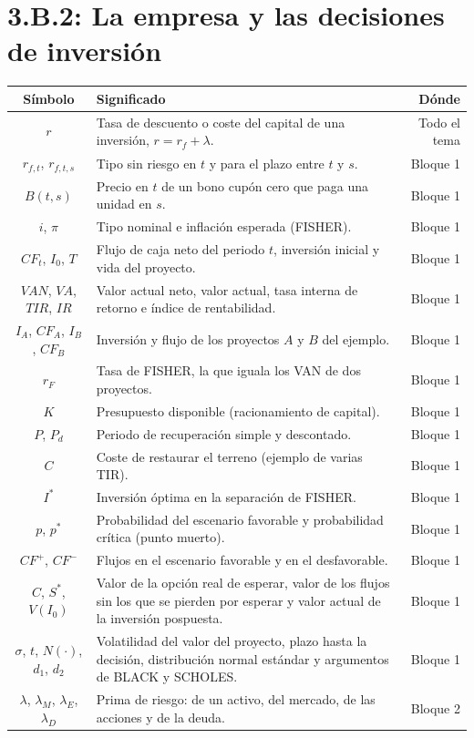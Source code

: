 \documentclass[10pt,a4paper]{article}
\newcommand{\cabecera}{\toprule\textbf{Símbolo} & \textbf{Significado} & \textbf{Dónde}\\\midrule\endhead\bottomrule\endfoot}
\begin{document}
\section{3.B.2: La empresa y las decisiones de inversión}
\begin{longtable}{SMD}
\cabecera
$r$ & Tasa de descuento o coste del capital de una inversión, $r=r_f+\lambda$. & Todo el tema\\
$r_{f,t}$, $r_{f,t,s}$ & Tipo sin riesgo en $t$ y para el plazo entre $t$ y $s$. & Bloque 1\\
$B(t,s)$ & Precio en $t$ de un bono cupón cero que paga una unidad en $s$. & Bloque 1\\
$i$, $\pi$ & Tipo nominal e inflación esperada (FISHER). & Bloque 1\\
$CF_t$, $I_0$, $T$ & Flujo de caja neto del periodo $t$, inversión inicial y vida del proyecto. & Bloque 1\\
$VAN$, $VA$, $TIR$, $IR$ & Valor actual neto, valor actual, tasa interna de retorno e índice de rentabilidad. & Bloque 1\\
$I_A$, $CF_A$, $I_B$, $CF_B$ & Inversión y flujo de los proyectos $A$ y $B$ del ejemplo. & Bloque 1\\
$r_F$ & Tasa de FISHER, la que iguala los VAN de dos proyectos. & Bloque 1\\
$K$ & Presupuesto disponible (racionamiento de capital). & Bloque 1\\
$P$, $P_d$ & Periodo de recuperación simple y descontado. & Bloque 1\\
$C$ & Coste de restaurar el terreno (ejemplo de varias TIR). & Bloque 1\\
$I^*$ & Inversión óptima en la separación de FISHER. & Bloque 1\\
$p$, $p^*$ & Probabilidad del escenario favorable y probabilidad crítica (punto muerto). & Bloque 1\\
$CF^+$, $CF^-$ & Flujos en el escenario favorable y en el desfavorable. & Bloque 1\\
$C$, $S^*$, $V(I_0)$ & Valor de la opción real de esperar, valor de los flujos sin los que se pierden por esperar y valor actual de la inversión pospuesta. & Bloque 1\\
$\sigma$, $t$, $N(\cdot)$, $d_1$, $d_2$ & Volatilidad del valor del proyecto, plazo hasta la decisión, distribución normal estándar y argumentos de BLACK y SCHOLES. & Bloque 1\\
$\lambda$, $\lambda_M$, $\lambda_E$, $\lambda_D$ & Prima de riesgo: de un activo, del mercado, de las acciones y de la deuda. & Bloque 2\\

\end{longtable}
\end{document}
